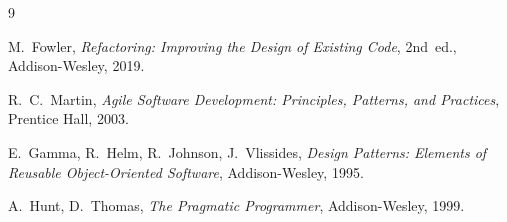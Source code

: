 \documentclass[11pt,a4paper]{article}
\begin{document}
\begin{thebibliography}{9}

  M.~Fowler,
  \emph{Refactoring: Improving the Design of Existing Code},
  2nd~ed., Addison-Wesley, 2019.

  R.~C.~Martin,
  \emph{Agile Software Development: Principles, Patterns, and Practices},
  Prentice Hall, 2003.

  E.~Gamma, R.~Helm, R.~Johnson, J.~Vlissides,
  \emph{Design Patterns: Elements of Reusable Object-Oriented Software},
  Addison-Wesley, 1995.

  A.~Hunt, D.~Thomas,
  \emph{The Pragmatic Programmer},
  Addison-Wesley, 1999.

\end{thebibliography}
\end{document}
